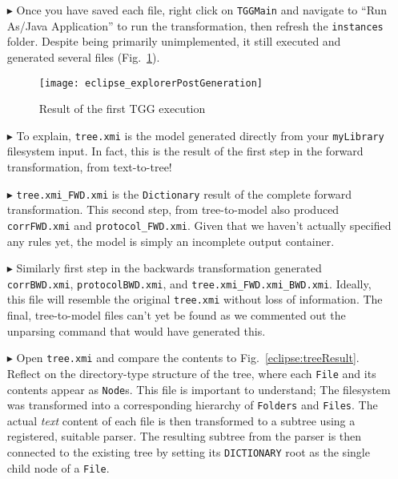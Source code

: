 \begin{enumerate} 

\item[$\blacktriangleright$] Once you have saved each file, right click on \texttt{TGGMain} and navigate to ``Run As/Java Application'' to run the
transformation, then refresh the \texttt{instances} folder. Despite being primarily unimplemented, it still executed and generated several files
(Fig.~\ref{eclipse:postParse}).

\vspace{0.5cm}

\begin{figure}[!htbp]
\begin{center}
 \texttt{[image: eclipse\_explorerPostGeneration]}
  \caption{Result of the first TGG execution}
  \label{eclipse:postParse}
\end{center}
\end{figure} 

\item[$\blacktriangleright$] To explain, \texttt{tree.xmi} is the model generated directly from your \texttt{myLibrary} filesystem input. In fact, this is the
result of the first step in the forward transformation, from text-to-tree!

\item[$\blacktriangleright$] \texttt{tree.xmi\_FWD.xmi} is the \texttt{Dictionary} result of the complete forward transformation. This second step, from
tree-to-model also produced \texttt{corrFWD.xmi} and \texttt{protocol\_FWD.xmi}. Given that we haven't actually specified any rules yet, the model is simply an
incomplete output container.

\clearpage

\item[$\blacktriangleright$] Similarly first step in the  backwards transformation generated \texttt{corrBWD.xmi}, \texttt{protocolBWD.xmi}, and
\texttt{tree.xmi\_FWD.xmi\_BWD.xmi}. Ideally, this file will resemble the original \texttt{tree.xmi} without loss of information. The final, tree-to-model files
can't yet be found as we commented out the unparsing command that would have generated this.

\item[$\blacktriangleright$] Open \texttt{tree.xmi} and compare the contents to Fig.~\ref{eclipse:treeResult}. Reflect on the directory-type structure of the
tree, where each \texttt{File} and its contents appear as \texttt{Node}s. This file is important to understand; The filesystem was transformed into a
corresponding hierarchy of \texttt{Folders} and \texttt{Files}. The actual \emph{text} content of each file is then transformed to a subtree using a registered,
suitable parser. The resulting subtree from the parser is then connected to the existing tree by setting its \texttt{DICTIONARY} root as the single child node
of a \texttt{File}.

\end{enumerate}

